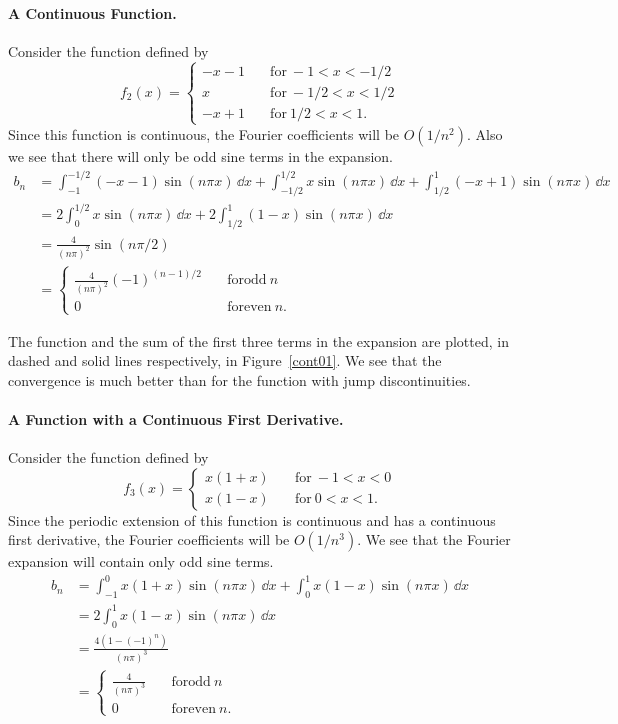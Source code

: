\begin{Example}
  \paragraph{A Continuous Function.}
  Consider the function defined by
  \[ f_2(x) = 
  \begin{cases}
    -x-1 \quad &\mathrm{for}\ -1 < x < -1/2 \\
    x \quad &\mathrm{for}\ -1/2 < x < 1/2 \\
    -x + 1 \quad &\mathrm{for}\ 1/2 < x < 1.
  \end{cases}
  \]
  Since this function is continuous, the Fourier coefficients will be $O(1/n^2)$.
  Also we see that there will only be odd sine terms in the expansion.
  \begin{align*}
    b_n     &= \int_{-1}^{-1/2} (-x-1)\sin(n\pi x)\,\dd x + 
    \int_{-1/2}^{1/2} x \sin(n\pi x)\,\dd x + 
    \int_{1/2}^1 (-x+1) \sin(n\pi x)\,\dd x \\
    &= 2\int_0^{1/2} x \sin(n \pi x)\,\dd x + 2 \int_{1/2}^1 (1-x)
    \sin(n \pi x)\,\dd x \\
    &= \frac{4}{(n\pi)^2} \sin(n\pi/2) \\
    &=      \begin{cases}
      \frac{4}{(n\pi)^2} (-1)^{(n-1)/2} \quad &\mathrm{for odd}\ n \\
      0 \quad &\mathrm{for even}\ n.
    \end{cases}
  \end{align*}

  The function and the sum of the first three terms in the expansion are plotted,
  in dashed and solid lines respectively, in Figure~\ref{cont01}.  
  We see that the convergence is much better than
  for the function with jump discontinuities.



  \paragraph{A Function with a Continuous First Derivative.}
  Consider the function defined by
  \[ f_3(x) = 
  \begin{cases}
    x(1+x) \quad &\mathrm{for}\ -1 < x < 0 \\
    x(1-x) \quad &\mathrm{for}\ 0 < x < 1.
  \end{cases}
  \]
  Since the periodic extension of this function is continuous and has a 
  continuous first derivative, the Fourier coefficients will be $O(1/n^3)$.
  We see that the Fourier expansion will contain only odd sine terms.
  \begin{align*}
    b_n     &= \int_{-1}^0 x(1+x) \sin(n \pi x)\,\dd x
    + \int_0^1 x(1-x) \sin(n \pi x)\,\dd x \\
    &= 2 \int_0^1 x(1-x) \sin(n \pi x)\,\dd x \\
    &= \frac{4(1 - (-1)^n)}{(n\pi)^3} \\
    &=      \begin{cases}
      \frac{4}{(n\pi)^3} \quad &\mathrm{for odd}\ n \\
      0 \quad &\mathrm{for even}\ n.
    \end{cases}
  \end{align*}



\end{Example}
